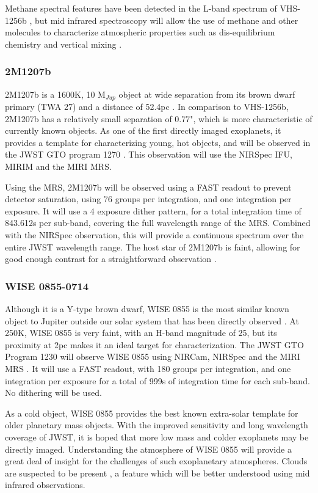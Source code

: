 Methane spectral features have been detected in the L-band spectrum of VHS-1256b \parencite{Miles2018}, but mid infrared spectroscopy will allow the use of methane and other molecules to characterize atmospheric properties such as dis-equilibrium chemistry and vertical mixing \parencite{Beichman2019}. 
\subsubsection{2M1207b}
2M1207b is a 1600K, 10 M$_{Jup}$ object at wide separation from its brown dwarf primary (TWA 27) and a distance of 52.4pc \parencite{Bowler2016}.
In comparison to VHS-1256b, 2M1207b has a relatively small separation of 0.77", which is more characteristic of currently known objects.
As one of the first directly imaged exoplanets, it provides a template for characterizing young, hot objects, and will be observed in the JWST GTO program 1270 \parencite{Birkmann2019}.
This observation will use the NIRSpec IFU, MIRIM and the MIRI MRS.

Using the MRS, 2M1207b will be observed using a FAST readout to prevent detector saturation, using 76 groups per integration, and one integration per exposure. 
It will use a 4 exposure dither pattern, for a total integration time of 843.612s per sub-band, covering the full wavelength range of the MRS. 
Combined with the NIRSpec observation, this will provide a continuous spectrum over the entire JWST wavelength range.
The host star of 2M1207b is faint, allowing for good enough contrast for a straightforward observation \parencite{Beichman2019}.
\subsubsection{WISE 0855-0714}
Although it is a Y-type brown dwarf, WISE 0855 is the most similar known object to Jupiter outside our solar system that has been directly observed \parencite{Luhman2014}. 
At 250K, WISE 0855 is very faint, with an H-band magnitude of 25, but its proximity at 2pc makes it an ideal target for characterization.
The JWST GTO Program 1230 will observe WISE 0855 using NIRCam, NIRSpec and the MIRI MRS \parencite{Oliveira2019}.
It will use a FAST readout, with 180 groups per integration, and one integration per exposure for a total of 999s of integration time for each sub-band. No dithering will be used.

As a cold object, WISE 0855 provides the best known extra-solar template for older planetary mass objects.
With the improved sensitivity and long wavelength coverage of JWST, it is hoped that more low mass and colder exoplanets may be directly imaged.
Understanding the atmosphere of WISE 0855 will provide a great deal of insight for the challenges of such exoplanetary atmospheres. 
Clouds are suspected to be present \parencite{Faherty2018}, a feature which will be better understood using mid infrared observations.

